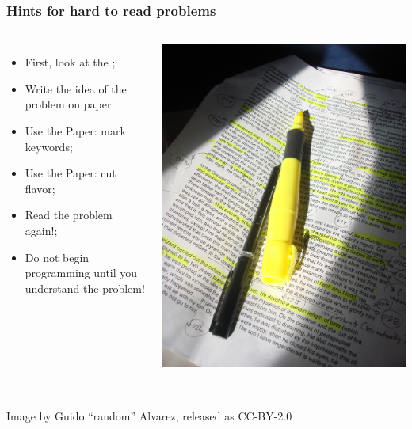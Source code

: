 \documentclass{beamer}
\begin{document}
\begin{frame}
  \frametitle{Hints for hard to read problems}

  \begin{columns}
    {\small
    \begin{itemize}
    \item First, look at the ;
    \item Write the idea of the problem on paper
    \item Use the Paper: mark keywords;
    \item Use the Paper: cut flavor;
    \item \alert{Read the problem again!};
    \item \alert{Do not begin programming until you understand the problem!}
    \end{itemize}
    }
    \includegraphics[width=\textwidth]{../img/textmarker}
  \end{columns}

  \vfill

  \hrulefill\\
  \hfill {\tiny Image by Guido ``random'' Alvarez, released as CC-BY-2.0}

\end{frame}
\end{document}
